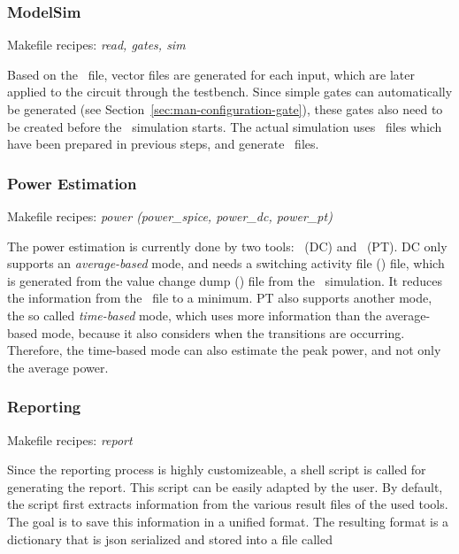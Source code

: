 \subsubsection{ModelSim}
\label{sec:man-work-waveform-modelsim}

Makefile recipes: \emph{read, gates, sim}

Based on the \crossingsjson\ file, vector files are generated for each input, 
which are later applied to the circuit through the testbench. Since simple 
gates can automatically be generated (see 
Section~\ref{sec:man-configuration-gate}), these gates also need to be created 
before the \modelsim\ simulation starts. The actual simulation uses
\dofile\ files which have been prepared in previous steps, and generate
\vcdfile\ files.

\subsubsection{Power Estimation}
\label{sec:man-work-waveform-power-estimation}

Makefile recipes: \emph{power (power\_spice, power\_dc, power\_pt)}

The power estimation is currently done by two tools: \dc\ (DC) and \primetime\ 
(PT). DC only supports an \emph{average-based} mode, and needs a switching 
activity file (\saiffile) file, which is generated from the value change dump 
(\vcdfile) file from the \modelsim\ simulation. It reduces the information from 
the \vcdfile\ file to a minimum. PT also supports another mode, the so called 
\emph{time-based} mode, which uses more information than the average-based 
mode, because it also considers when the transitions are occurring. Therefore, 
the time-based mode can also estimate the peak power, and not only the average 
power.

\subsubsection{Reporting}
\label{sec:man-work-waveform-reporting}

Makefile recipes: \emph{report}

Since the reporting process is highly customizeable, a shell script is
called for generating the report. This script can be easily adapted by
the user. By default, the script first extracts information from the
various result files of the used tools. The goal is to save this
information in a unified format. The resulting format is a dictionary
that is json serialized and stored into a file called
\resultsjson

